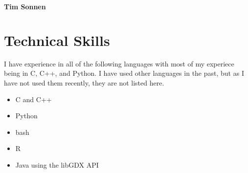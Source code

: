 \documentclass[10pt]{article}
\begin{document}
\noindent
\centerline{\textbf{Tim Sonnen}}
\centerline{}
\section*{Technical Skills}
	\vspace{2mm}
	\begin{adjustwidth}{5mm}{}
	I have experience in all of the following languages with most of my experiece 
	being in C, C++, and Python. I have used other languages in the past, but as 
	I have not used them recently, they are not listed here.
	  \begin{itemize}[noitemsep, nolistsep]
	  	\item C and C++
	  	\item Python
	  	\item bash
	  	\item R
	  	\item Java using the libGDX API
	  \end{itemize}
	\end{adjustwidth}
\end{document}
